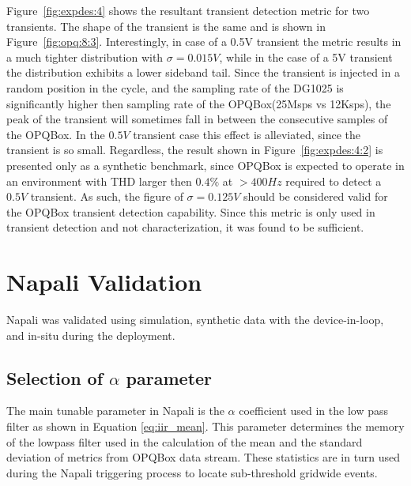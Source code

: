 Figure~\ref{fig:expdes:4} shows the resultant transient detection metric for two transients.
The shape of the transient is the same and is shown in Figure~\ref{fig:opq:8:3}.
Interestingly, in case of a 0.5V transient the metric results in a much tighter distribution with $\sigma =0.015V$, while in the case of
a 5V transient the distribution exhibits a lower sideband tail.
Since the transient is injected in a random position in the cycle, and the sampling rate of the DG1025 is significantly higher then sampling rate of the OPQBox(25Msps vs 12Ksps), the peak of the transient will sometimes fall in between the consecutive samples of the OPQBox.
In the $0.5V$ transient case this effect is alleviated, since the transient is so small.
Regardless, the result shown in Figure~\ref{fig:expdes:4:2} is presented only as a synthetic benchmark, since OPQBox is expected to operate in an environment with THD larger then $0.4\%$ at $>400Hz$ required to detect a $0.5V$ transient.
As such, the figure of $\sigma=0.125V$ should be considered valid for the OPQBox transient detection capability.
Since this metric is only used in transient detection and not characterization, it was found to be sufficient.

\section{Napali Validation}\label{sec:napali-validation.}

Napali was validated using simulation, synthetic data with the device-in-loop, and in-situ during the deployment.


\subsection{Selection of $\alpha$ parameter}\label{subsec:selectrion-ofparameter}

The main tunable parameter in Napali is the $\alpha$ coefficient used in the low pass filter as shown in Equation \ref{eq:iir_mean}.
This parameter determines the memory of the lowpass filter used in the calculation of the mean and the standard deviation of metrics from OPQBox data stream.
These statistics are in turn used during the Napali triggering process to locate sub-threshold gridwide events.

